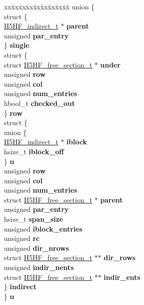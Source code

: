 \begin{DoxyCompactItemize}
\begin{tabbing}
\end{tabbing}\item 
\mbox{\label{struct_h5_h_f__free__section__t_ad621f595b197023705581fc74b726b62}} 
\begin{tabbing}
xx\=xx\=xx\=xx\=xx\=xx\=xx\=xx\=xx\=\kill
union \{\\
\>struct \{\\
\>\>\hyperlink{struct_h5_h_f__indirect__t}{H5HF\_indirect\_t} $\ast$ {\bfseries parent}\\
\>\>unsigned {\bfseries par\_entry}\\
\>\} {\bfseries single}\\
\>struct \{\\
\>\>struct \hyperlink{struct_h5_h_f__free__section__t}{H5HF\_free\_section\_t} $\ast$ {\bfseries under}\\
\>\>unsigned {\bfseries row}\\
\>\>unsigned {\bfseries col}\\
\>\>unsigned {\bfseries num\_entries}\\
\>\>hbool\_t {\bfseries checked\_out}\\
\>\} {\bfseries row}\\
\>struct \{\\
\>\>union \{\\
\>\>\>\hyperlink{struct_h5_h_f__indirect__t}{H5HF\_indirect\_t} $\ast$ {\bfseries iblock}\\
\>\>\>hsize\_t {\bfseries iblock\_off}\\
\>\>\} {\bfseries u}\\
\>\>unsigned {\bfseries row}\\
\>\>unsigned {\bfseries col}\\
\>\>unsigned {\bfseries num\_entries}\\
\>\>struct \hyperlink{struct_h5_h_f__free__section__t}{H5HF\_free\_section\_t} $\ast$ {\bfseries parent}\\
\>\>unsigned {\bfseries par\_entry}\\
\>\>hsize\_t {\bfseries span\_size}\\
\>\>unsigned {\bfseries iblock\_entries}\\
\>\>unsigned {\bfseries rc}\\
\>\>unsigned {\bfseries dir\_nrows}\\
\>\>struct \hyperlink{struct_h5_h_f__free__section__t}{H5HF\_free\_section\_t} $\ast$$\ast$ {\bfseries dir\_rows}\\
\>\>unsigned {\bfseries indir\_nents}\\
\>\>struct \hyperlink{struct_h5_h_f__free__section__t}{H5HF\_free\_section\_t} $\ast$$\ast$ {\bfseries indir\_ents}\\
\>\} {\bfseries indirect}\\
\} {\bfseries u}\\

\end{tabbing}\end{DoxyCompactItemize}


